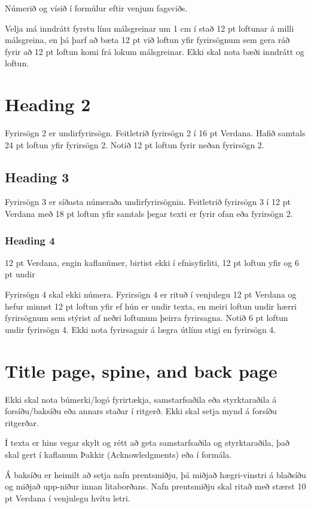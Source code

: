 \documentclass[a4paper,12pt,twoside,BCOR=10mm]{scrbook}
\begin{document}
Númerið og vísið í formúlur eftir venjum fagsviðs.

Velja má inndrátt fyrstu línu málsgreinar um 1 cm í stað 12 pt loftunar á milli málsgreina, en þá þarf að bæta 12 pt við loftun yfir fyrirsögnum sem gera ráð fyrir að 12 pt loftun komi frá lokum málsgreinar. Ekki skal nota bæði inndrátt og loftun.

\section{Heading 2}
Fyrirsögn 2 er undirfyrirsögn. Feitletrið fyrirsögn 2 í 16 pt Verdana. Hafið samtals 24 pt loftun yfir fyrirsögn 2. Notið 12 pt loftun fyrir neðan fyrirsögn 2.

\subsection{Heading 3}
Fyrirsögn 3 er síðasta númeraða undirfyrirsögnin. Feitletrið fyrirsögn 3 í 12 pt Verdana með 18 pt loftun yfir samtals þegar texti er fyrir ofan eða fyrirsögn 2. 
\subsubsection{Heading 4}
12 pt Verdana, engin kaflanúmer, birtist ekki í efnisyfirliti, 12 pt loftun yfir og 6 pt undir

Fyrirsögn 4 skal ekki númera. Fyrirsögn 4 er rituð í venjulegu 12 pt Verdana og hefur minnst 12 pt loftun yfir ef hún er undir texta, en meiri loftun undir hærri fyrirsögnum sem stýrist af neðri loftunum þeirra fyrirsagna. Notið 6 pt loftun undir fyrirsögn 4.
Ekki nota fyrirsagnir á lægra útlínu stigi en fyrirsögn 4.

\section{Title page, spine, and back page}
Ekki skal nota búmerki/logó fyrirtækja, samstarfsaðila eða styrktaraðila á forsíðu/baksíðu eða annars staðar í ritgerð. Ekki skal setja mynd á forsíðu ritgerðar. 

Í texta er hins vegar skylt og rétt að geta samstarfsaðila og styrktaraðila, það skal gert í kaflanum Þakkir (Acknowledgments) eða í formála.

Á baksíðu er heimilt að setja nafn prentsmiðju, þá miðjað hægri-vinstri á blaðsíðu og miðjað upp-niður innan litaborðans. Nafn prentsmiðju skal ritað með stærst 10 pt Verdana í venjulegu hvítu letri.
\end{document}
